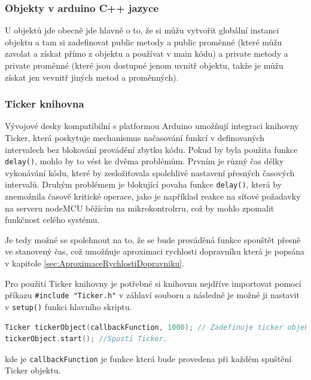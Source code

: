 \subsubsection{Objekty v arduino C++ jazyce}

U objektů jde obecně jde hlavně o to, že si můžu vytvořit globální instanci objektu a tam si zadefinovat public metody a public proměnné (které můžu zavolat a získat přímo z objektu a používat v main kódu) a private metody a private proměnné (které jsou dostupné jenom uvnitř objektu, takže je můžu získat jen vevnitř jiných metod a proměnných).

\subsubsection{Ticker knihovna}\label{sec:TickerKnihovna}

Vývojové desky kompatibilní s platformou Arduino umožňují integraci knihovny Ticker, která poskytuje mechanismus načasování funkcí v definovaných intervalech bez blokování provádění zbytku kódu. Pokud by byla použita funkce \texttt{delay()}, mohlo by to vést ke dvěma problémům. Prvním je různý čas délky vykonávání kódu, které by zesložiťovala spolehlivé nastavení přesných časových intervalů. Druhým problémem je blokující povaha funkce \texttt{delay()}, která by znemožnila časově kritické operace, jako je například reakce na síťové požadavky na serveru nodeMCU běžícím na mikrokontrolrru, což by mohlo zpomalit funkčnost celého systému. \cite{TickerKnihovna}

Je tedy možné se spolehnout na to, že se bude prováděná funkce spouštět přesně ve stanovený čas, což umožňuje aproximaci rychlosti dopravníku která je popsána v kapitole \ref{sec:AproximaceRychlostiDopravniku}.

Pro použití Ticker knihovny je potřebné si knihovnu nejdříve importovat pomocí příkazu \texttt{\#include "Ticker.h"} v záhlaví souboru a následně je možné ji nastavit v \texttt{setup()} funkci hlavního skriptu.

\begin{lstlisting}[language=C++, caption={Použití ticker knihovny uvnitř \texttt{setup()} funkce \cite{TickerGitHubPage}}, label={lst:TickerUkazka}]
Ticker tickerObject(callbackFunction, 1000); // Zadefinuje ticker objekt
tickerObject.start(); //Spusti Ticker.
\end{lstlisting}
kde je \texttt{callbackFunction} je funkce která bude provedena při každém spuštění Ticker objektu.

